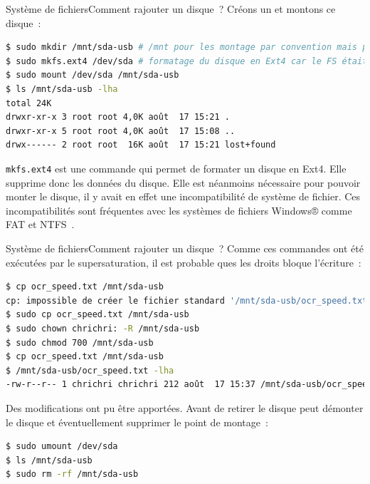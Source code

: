 \documentclass{beamer}
\begin{document}
    \begin{frame}[fragile]{Système de fichiers}{Comment rajouter un disque~?}
        Créons un  et montons ce disque~:
        \begin{lstlisting}[language=bash]
$ sudo mkdir /mnt/sda-usb # /mnt pour les montage par convention mais peut être ailleurs
$ sudo mkfs.ext4 /dev/sda # formatage du disque en Ext4 car le FS était incompatible
$ sudo mount /dev/sda /mnt/sda-usb
$ ls /mnt/sda-usb -lha
total 24K
drwxr-xr-x 3 root root 4,0K août  17 15:21 .
drwxr-xr-x 5 root root 4,0K août  17 15:08 ..
drwx------ 2 root root  16K août  17 15:21 lost+found
        \end{lstlisting}
        \begin{dangercolorbox}
            \lstinline{mkfs.ext4} est une commande qui permet de formater un disque en Ext4.
            Elle supprime donc les données du disque.
            Elle est néanmoins nécessaire pour pouvoir monter le disque, il y avait en effet une incompatibilité de système de fichier.
            Ces incompatibilités sont fréquentes avec les systèmes de fichiers Windows® comme FAT et NTFS~.
        \end{dangercolorbox}
    \end{frame}

    \begin{frame}[fragile]{Système de fichiers}{Comment rajouter un disque~?}
        Comme ces commandes ont été exécutées par le supersaturation, il est probable ques les droits bloque l'écriture~:
        \begin{lstlisting}[language=bash]
$ cp ocr_speed.txt /mnt/sda-usb
cp: impossible de créer le fichier standard '/mnt/sda-usb/ocr_speed.txt': Permission non accordée
$ sudo cp ocr_speed.txt /mnt/sda-usb
$ sudo chown chrichri: -R /mnt/sda-usb
$ sudo chmod 700 /mnt/sda-usb
$ cp ocr_speed.txt /mnt/sda-usb
$ /mnt/sda-usb/ocr_speed.txt -lha
-rw-r--r-- 1 chrichri chrichri 212 août  17 15:37 /mnt/sda-usb/ocr_speed.txt
        \end{lstlisting}
        Des modifications ont pu être apportées.
        \bigbreak
        Avant de retirer le disque peut démonter le disque et éventuellement supprimer le point de montage~:
        \begin{lstlisting}[language=bash]
$ sudo umount /dev/sda
$ ls /mnt/sda-usb
$ sudo rm -rf /mnt/sda-usb
        \end{lstlisting}
    \end{frame}
\end{document}
